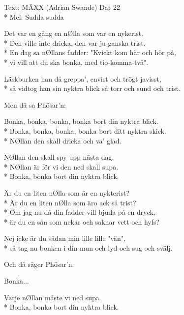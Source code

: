 \begin{SongText}
    \begin{SongInfo}
        Text: MÄXX (Adrian Swande) Dat 22\\*%
        Mel: Sudda sudda 
    \end{SongInfo}
    \begin{SongVerse}
        Det var en gång en nØlla som var en nykerist.\\*%
        Den ville inte dricka, den var ju ganska trist.\\*%
        En dag sa nØllans fadder: "Kvickt kom här och hör på,\\*%
        vi vill att du ska bonka, med tio-komma-två".
    \end{SongVerse}
    \begin{SongVerse}
        Läskburken han då greppa', envist och trögt javisst,\\*%
        så vidtog han sin nyktra blick så torr och sund och trist.
    \end{SongVerse}
    \begin{SongVerse}
        Men då sa Phösar'n:
    \end{SongVerse}
    \begin{SongVerse}
        Bonka, bonka, bonka, bonka bort din nyktra blick.\\*%
        Bonka, bonka, bonka, bonka bort ditt nyktra skick.\\*%
        NØllan den skall dricka och va' glad.
    \end{SongVerse}
    \begin{SongVerse}
        NØllan den skall spy upp nästa dag.\\*%
        NØllan är för vi den ned skall supa.\\*%
        Bonka, bonka bort din nyktra blick.
    \end{SongVerse}
    \begin{SongVerse}
        Är du en liten nØlla som är en nykterist?\\*%
        Är du en liten nØlla som äro ack så trist?\\*%
        Om jag nu då din fadder vill bjuda på en dryck,\\*%
        är du en sån som nekar och saknar vett och hyfs?
    \end{SongVerse}
    \begin{SongVerse}
        Nej icke är du sådan min lille lille "vän",\\*%
        så tag nu bonken i din mun och lyd och sug och svälj.
    \end{SongVerse}
    \begin{SongVerse}
        Och då säger Phösar'n:
    \end{SongVerse}
    \begin{SongVerse}
        Bonka...
    \end{SongVerse}
    \begin{SongVerse}
        Varje nØllan måste vi ned supa.\\*%
    Bonka, bonka bort din nyktra blick.
    \end{SongVerse}
\end{SongText}